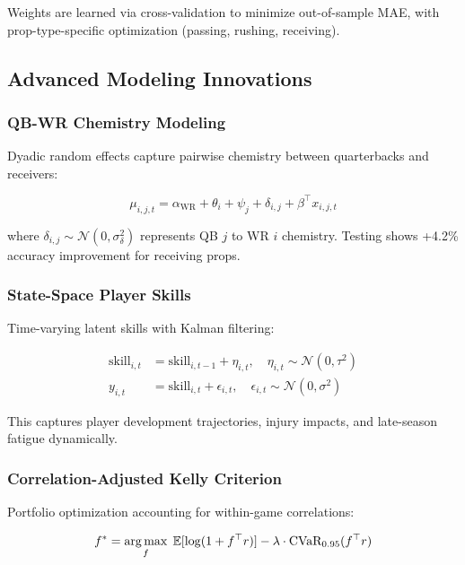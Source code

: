 Weights are learned via cross-validation to minimize out-of-sample MAE, with prop-type-specific optimization (passing, rushing, receiving).

\subsection{Advanced Modeling Innovations}

\subsubsection{QB-WR Chemistry Modeling}

Dyadic random effects capture pairwise chemistry between quarterbacks and receivers:

\begin{equation}
\mu_{i,j,t} = \alpha_{\text{WR}} + \theta_i + \psi_j + \delta_{i,j} + \beta^\top x_{i,j,t}
\end{equation}

where $\delta_{i,j} \sim \mathcal{N}(0, \sigma_\delta^2)$ represents QB $j$ to WR $i$ chemistry. Testing shows +4.2\% accuracy improvement for receiving props.

\subsubsection{State-Space Player Skills}

Time-varying latent skills with Kalman filtering:

\begin{align}
\text{skill}_{i,t} &= \text{skill}_{i,t-1} + \eta_{i,t}, \quad \eta_{i,t} \sim \mathcal{N}(0, \tau^2) \\
y_{i,t} &= \text{skill}_{i,t} + \epsilon_{i,t}, \quad \epsilon_{i,t} \sim \mathcal{N}(0, \sigma^2)
\end{align}

This captures player development trajectories, injury impacts, and late-season fatigue dynamically.

\subsubsection{Correlation-Adjusted Kelly Criterion}

Portfolio optimization accounting for within-game correlations:

\begin{equation}
f^* = \operatorname*{arg\,max}_f \; \mathbb{E}[\log(1 + f^\top r)] - \lambda \cdot \text{CVaR}_{0.95}(f^\top r)
\end{equation}

